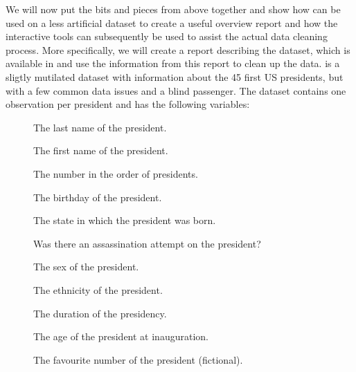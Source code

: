 \documentclass[article,shortnames]{jss}
\begin{document}
We will now put the bits and pieces from above together and show how  can be used on a less artificial dataset to create a useful overview report and how the interactive tools can subsequently be used to assist the actual data cleaning process. More specifically, we will create a report describing the  dataset, which is available in  and use the information from this report to clean up the data.  is a sligtly mutilated dataset with information about the 45 first US presidents, but with a few common data issues and a blind passenger. The dataset contains one observation per president and has the following variables:
\begin{description}
\item[] The last name of the president.
\item[] The first name of the president.
\item[] The number in the order of presidents.
\item[] The birthday of the president.
\item[] The state in which the president was born.
\item[] Was there an assassination attempt on the president?
\item[] The sex of the president.
\item[] The ethnicity of the president.
\item[] The duration of the presidency.
\item[] The age of the president at inauguration.
\item[] The favourite number of the president (fictional).
\end{description}
\end{document}
